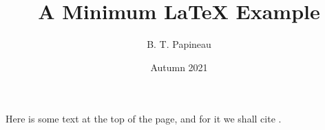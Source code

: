 \documentclass{article}
\title{A Minimum LaTeX Example}
\date{Autumn 2021}
\author{B. T. Papineau}
\begin{document}
	\maketitle
	
	\newpage
	Here is some text at the top of the page, and for it we shall cite \textcite{levy2008}.
	
	\printbibliography
\end{document}
